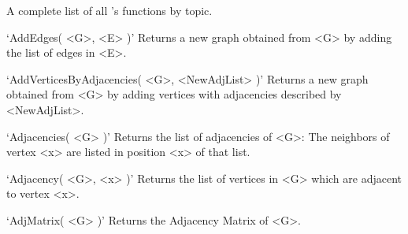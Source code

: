 
A complete list of all {\YAGS}'s functions by topic.


`AddEdges( <G>, <E> )'\newline\hglue 5mm 
Returns a new graph obtained from <G> by adding the list of edges in <E>.

`AddVerticesByAdjacencies( <G>, <NewAdjList> )'\newline\hglue 5mm 
Returns a new graph obtained from <G> by adding vertices with adjacencies described by <NewAdjList>.

`Adjacencies( <G> )'\newline\hglue 5mm 
Returns the list of adjacencies of <G>: The neighbors of vertex <x> are listed in position <x> of that list.

`Adjacency( <G>, <x> )'\newline\hglue 5mm 
Returns the list of vertices in <G> which are adjacent to vertex <x>.

`AdjMatrix( <G> )'\newline\hglue 5mm 
Returns the Adjacency Matrix of <G>.

















